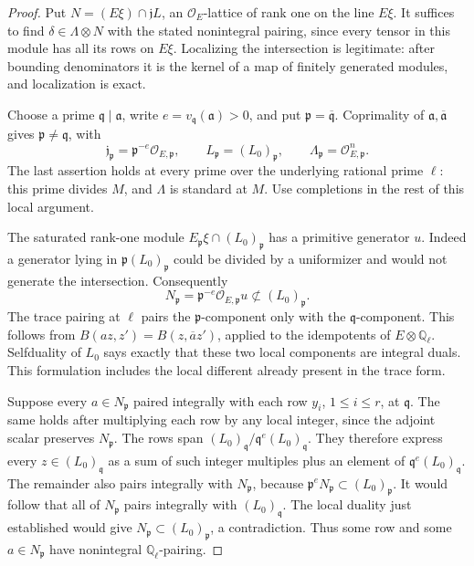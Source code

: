 \begin{proof}
Put \(N=(E\xi)\cap\mathfrak jL\), an
\(\mathcal O_E\)-lattice of rank one on the line \(E\xi\).
It suffices to find \(\delta\in\Lambda\otimes N\) with the
stated nonintegral pairing, since every tensor in this module
has all its rows on \(E\xi\).
Localizing the intersection is legitimate: after bounding
denominators it is the kernel of a map of finitely generated
modules, and localization is exact.

Choose a prime \(\mathfrak q\mid\mathfrak a\), write
\(e=v_{\mathfrak q}(\mathfrak a)>0\), and put
\(\mathfrak p=\overline{\mathfrak q}\).
Coprimality of \(\mathfrak a,\overline{\mathfrak a}\)
gives \(\mathfrak p\ne\mathfrak q\), with
\[
 \mathfrak j_{\mathfrak p}
       =\mathfrak p^{-e}\mathcal O_{E,\mathfrak p},
 \qquad L_{\mathfrak p}=(L_0)_{\mathfrak p},\qquad
 \Lambda_{\mathfrak p}=\mathcal O_{E,\mathfrak p}^n .
\]
The last assertion holds at every prime over the underlying
rational prime \(\ell\): this prime divides \(M\), and
\(\Lambda\) is standard at \(M\).
Use completions in the rest of this local argument.

The saturated rank-one module
\(E_{\mathfrak p}\xi\cap(L_0)_{\mathfrak p}\)
has a primitive generator \(u\).
Indeed a generator lying in
\(\mathfrak p(L_0)_{\mathfrak p}\) could be divided by a
uniformizer and would not generate the intersection.
Consequently
\[
       N_{\mathfrak p}
            =\mathfrak p^{-e}\mathcal O_{E,\mathfrak p}u
                      \not\subset (L_0)_{\mathfrak p}.
\]
The trace pairing at \(\ell\) pairs the
\(\mathfrak p\)-component only with the
\(\mathfrak q\)-component.  This follows from
\(B(az,z')=B(z,\overline a z')\), applied to the idempotents
of \(E\otimes\mathbb Q_\ell\).
Selfduality of \(L_0\) says exactly that these two local
components are integral duals.  This formulation includes the
local different already present in the trace form.

Suppose every \(a\in N_{\mathfrak p}\) paired integrally with
each row \(y_i\), \(1\le i\le r\), at \(\mathfrak q\).
The same holds after multiplying each row by any local
integer, since the adjoint scalar preserves \(N_{\mathfrak p}\).
The rows span
\((L_0)_{\mathfrak q}/\mathfrak q^e(L_0)_{\mathfrak q}\).
They therefore express every \(z\in(L_0)_{\mathfrak q}\) as
a sum of such integer multiples plus an element of
\(\mathfrak q^e(L_0)_{\mathfrak q}\).
The remainder also pairs integrally with \(N_{\mathfrak p}\),
because
\(\mathfrak p^eN_{\mathfrak p}
 \subset(L_0)_{\mathfrak p}\).
It would follow that all of \(N_{\mathfrak p}\) pairs
integrally with \((L_0)_{\mathfrak q}\).
The local duality just established would give
\(N_{\mathfrak p}\subset(L_0)_{\mathfrak p}\), a contradiction.
Thus some row and some \(a\in N_{\mathfrak p}\) have
nonintegral \(\mathbb Q_\ell\)-pairing.


\end{proof}
